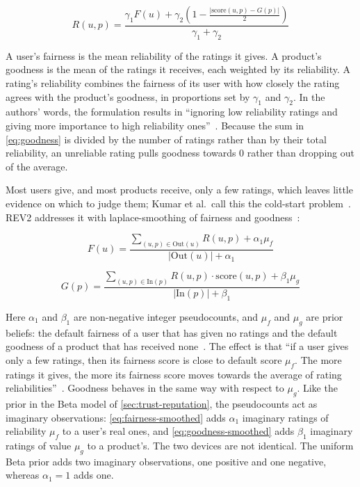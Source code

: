 \begin{equation}\label{eq:reliability}
  R(u,p) = \frac{\gamma_1 F(u) + \gamma_2 \left(1 - \frac{\lvert\mathrm{score}(u,p) - G(p)\rvert}{2}\right)}{\gamma_1 + \gamma_2}
\end{equation}

A user's fairness is the mean reliability of the ratings it gives. A product's goodness is the mean of the ratings it receives, each weighted by its reliability. A rating's reliability combines the fairness of its user with how closely the rating agrees with the product's goodness, in proportions set by $\gamma_1$ and $\gamma_2$. In the authors' words, the formulation results in \enquote{ignoring low reliability ratings and giving more importance to high reliability ones}~\cite[p.~336]{Kumar2018}. Because the sum in \cref{eq:goodness} is divided by the number of ratings rather than by their total reliability, an unreliable rating pulls goodness towards 0 rather than dropping out of the average.

Most users give, and most products receive, only a few ratings, which leaves little evidence on which to judge them; Kumar et al.\ call this the \gls{cold-start} problem~\cite[p.~336]{Kumar2018}. REV2 addresses it with \gls{laplace-smoothing} of fairness and goodness~\cite[p.~336]{Kumar2018}:

\begin{equation}\label{eq:fairness-smoothed}
  F(u) = \frac{\sum_{(u,p)\in \mathrm{Out}(u)} R(u,p) + \alpha_1 \mu_f}{\lvert\mathrm{Out}(u)\rvert + \alpha_1}
\end{equation}

\begin{equation}\label{eq:goodness-smoothed}
  G(p) = \frac{\sum_{(u,p)\in \mathrm{In}(p)} R(u,p)\cdot \mathrm{score}(u,p) + \beta_1 \mu_g}{\lvert\mathrm{In}(p)\rvert + \beta_1}
\end{equation}

Here $\alpha_1$ and $\beta_1$ are non-negative integer \glspl{pseudocount}, and $\mu_f$ and $\mu_g$ are \gls{prior} beliefs: the default fairness of a user that has given no ratings and the default goodness of a product that has received none~\cite[p.~336]{Kumar2018}. The effect is that \enquote{if a user gives only a few ratings, then its fairness score is close to default score $\mu_f$. The more ratings it gives, the more its fairness score moves towards the average of rating reliabilities}~\cite[p.~336]{Kumar2018}. Goodness behaves in the same way with respect to $\mu_g$. Like the prior in the Beta model of \cref{sec:trust-reputation}, the pseudocounts act as imaginary observations: \cref{eq:fairness-smoothed} adds $\alpha_1$ imaginary ratings of reliability $\mu_f$ to a user's real ones, and \cref{eq:goodness-smoothed} adds $\beta_1$ imaginary ratings of value $\mu_g$ to a product's. The two devices are not identical. The uniform Beta prior adds two imaginary observations, one positive and one negative, whereas $\alpha_1 = 1$ adds one.

